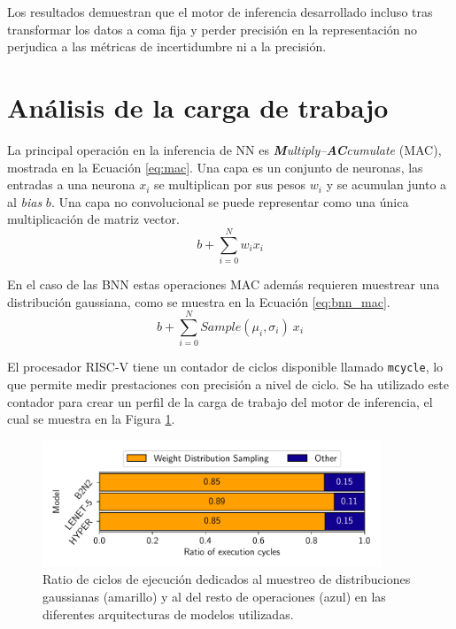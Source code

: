 Los resultados demuestran que el motor de inferencia desarrollado incluso tras transformar los datos a coma fija y perder precisión en la representación no perjudica a las métricas de incertidumbre ni a la precisión.

\section{Análisis de la carga de trabajo}

La principal operación en la inferencia de NN es \textit{\textbf{M}ultiply–\textbf{AC}cumulate} (MAC), mostrada en la Ecuación \ref{eq:mac}. Una capa es un conjunto de neuronas, las entradas a una neurona $x_i$ se multiplican por sus pesos $w_i$ y se acumulan junto a al \textit{bias} $b$. Una capa no convolucional se puede representar como una única multiplicación de matriz vector.
\begin{equation} \label{eq:mac}
b + \sum_{i=0}^N w_i x_i
\end{equation}

En el caso de las BNN estas operaciones MAC además requieren muestrear una distribución gaussiana, como se muestra en la Ecuación \ref{eq:bnn_mac}.
\begin{equation} \label{eq:bnn_mac}
b + \sum_{i=0}^N Sample(\mu_i, \sigma_i)\ x_i
\end{equation}

El procesador RISC-V tiene un contador de ciclos disponible llamado \texttt{mcycle}, lo que permite medir prestaciones con precisión a nivel de ciclo. Se ha utilizado este contador para crear un perfil de la carga de trabajo del motor de inferencia, el cual se muestra en la Figura \ref{fig:cycle_profile}.

\begin{figure}[h]
    \centering
    \includegraphics[width=0.9\textwidth]{root/Imagenes/4_bnn_riscv/cycles.pdf}
    \caption{Ratio de ciclos de ejecución dedicados al muestreo de distribuciones gaussianas (amarillo) y al del resto de operaciones (azul) en las diferentes arquitecturas de modelos utilizadas.}
    \label{fig:cycle_profile}
\end{figure}

